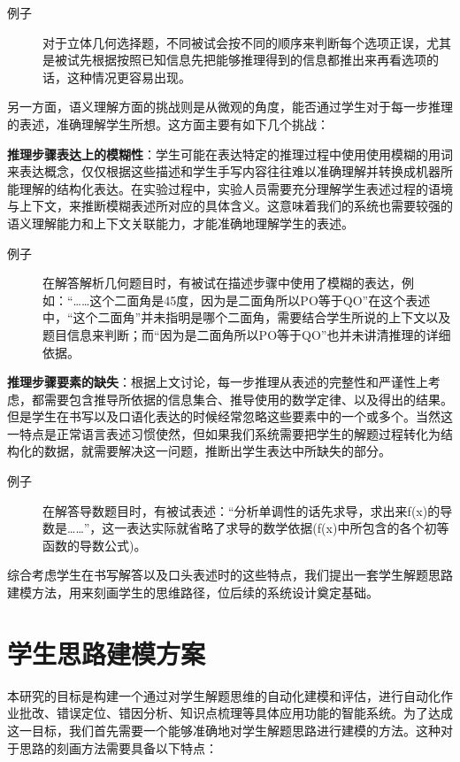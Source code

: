 \begin{description}
    \item[例子] 对于立体几何选择题，不同被试会按不同的顺序来判断每个选项正误，尤其是被试先根据按照已知信息先把能够推理得到的信息都推出来再看选项的话，这种情况更容易出现。
\end{description}

另一方面，语义理解方面的挑战则是从微观的角度，能否通过学生对于每一步推理的表述，准确理解学生所想。这方面主要有如下几个挑战：

\textbf{推理步骤表达上的模糊性}：学生可能在表达特定的推理过程中使用使用模糊的用词来表达概念，仅仅根据这些描述和学生手写内容往往难以准确理解并转换成机器所能理解的结构化表达。在实验过程中，实验人员需要充分理解学生表述过程的语境与上下文，来推断模糊表述所对应的具体含义。这意味着我们的系统也需要较强的语义理解能力和上下文关联能力，才能准确地理解学生的表述。

\begin{description}
    \item[例子] 在解答解析几何题目时，有被试在描述步骤中使用了模糊的表达，例如：“……这个二面角是45度，因为是二面角所以PO等于QO”在这个表述中，“这个二面角”并未指明是哪个二面角，需要结合学生所说的上下文以及题目信息来判断；而“因为是二面角所以PO等于QO”也并未讲清推理的详细依据。
\end{description}

\textbf{推理步骤要素的缺失}：根据上文讨论，每一步推理从表述的完整性和严谨性上考虑，都需要包含推导所依据的信息集合、推导使用的数学定律、以及得出的结果。但是学生在书写以及口语化表达的时候经常忽略这些要素中的一个或多个。当然这一特点是正常语言表述习惯使然，但如果我们系统需要把学生的解题过程转化为结构化的数据，就需要解决这一问题，推断出学生表达中所缺失的部分。

\begin{description}
    \item[例子] 在解答导数题目时，有被试表述：“分析单调性的话先求导，求出来f(x)的导数是……”，这一表达实际就省略了求导的数学依据(f(x)中所包含的各个初等函数的导数公式)。
\end{description}

综合考虑学生在书写解答以及口头表述时的这些特点，我们提出一套学生解题思路建模方法，用来刻画学生的思维路径，位后续的系统设计奠定基础。

\section{学生思路建模方案}

本研究的目标是构建一个通过对学生解题思维的自动化建模和评估，进行自动化作业批改、错误定位、错因分析、知识点梳理等具体应用功能的智能系统。为了达成这一目标，我们首先需要一个能够准确地对学生解题思路进行建模的方法。这种对于思路的刻画方法需要具备以下特点：

